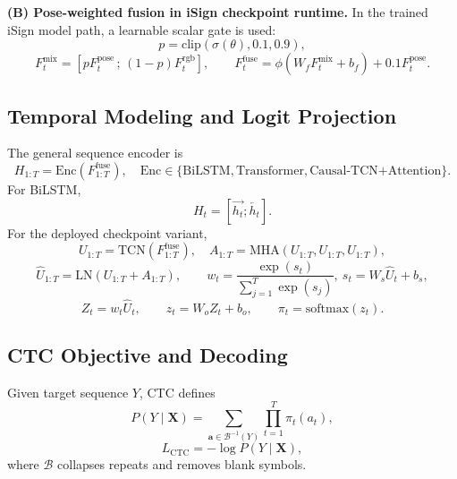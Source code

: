 \textbf{(B) Pose-weighted fusion in iSign checkpoint runtime.} In the trained iSign model path, a learnable scalar gate is used:
\begin{equation}
p = \mathrm{clip}(\sigma(\theta),0.1,0.9),
\end{equation}
\begin{equation}
F_t^{\mathrm{mix}} = \left[pF_t^{\mathrm{pose}}\,;\,(1-p)F_t^{\mathrm{rgb}}\right],
\qquad
F_t^{\mathrm{fuse}} = \phi(W_fF_t^{\mathrm{mix}} + b_f) + 0.1F_t^{\mathrm{pose}}.
\end{equation}

\subsection{Temporal Modeling and Logit Projection}
The general sequence encoder is
\begin{equation}
H_{1:T} = \mathrm{Enc}(F_{1:T}^{\mathrm{fuse}}),
\quad
\mathrm{Enc}\in\{\text{BiLSTM},\text{Transformer},\text{Causal-TCN+Attention}\}.
\end{equation}
For BiLSTM,
\begin{equation}
H_t = \left[\overrightarrow{h_t};\overleftarrow{h_t}\right].
\end{equation}
For the deployed checkpoint variant,
\begin{equation}
U_{1:T}=\mathrm{TCN}(F_{1:T}^{\mathrm{fuse}}),
\quad
A_{1:T}=\mathrm{MHA}(U_{1:T},U_{1:T},U_{1:T}),
\end{equation}
\begin{equation}
\hat{U}_{1:T}=\mathrm{LN}(U_{1:T}+A_{1:T}),
\qquad
w_t=\frac{\exp(s_t)}{\sum_{j=1}^{T}\exp(s_j)},\ s_t=W_s\hat{U}_t+b_s,
\end{equation}
\begin{equation}
Z_t = w_t\hat{U}_t,
\qquad
z_t = W_oZ_t+b_o,
\qquad
\pi_t = \mathrm{softmax}(z_t).
\end{equation}

\subsection{CTC Objective and Decoding}
Given target sequence $Y$, CTC defines
\begin{equation}
P(Y\mid \mathbf{X}) = \sum_{\mathbf{a}\in\mathcal{B}^{-1}(Y)}\prod_{t=1}^{T}\pi_t(a_t),
\end{equation}
\begin{equation}
L_{\mathrm{CTC}} = -\log P(Y\mid \mathbf{X}),
\end{equation}
where $\mathcal{B}$ collapses repeats and removes blank symbols.

